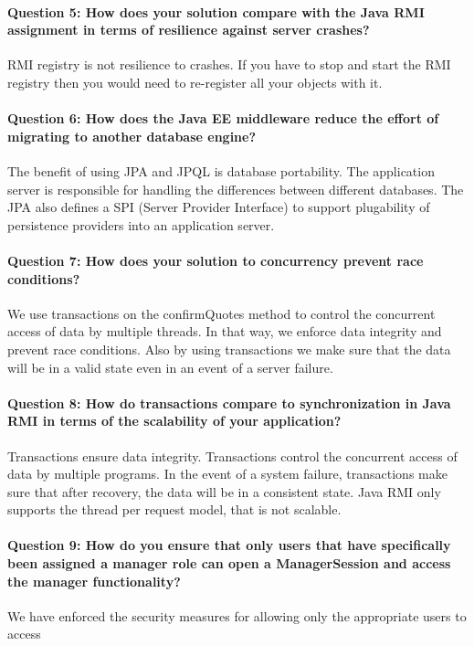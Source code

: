 \documentclass{ds-report}
\begin{document}
	\paragraph{Question 5: How does your solution compare with the Java RMI assignment in terms of resilience against server crashes?\\} 
	RMI registry is not resilience to crashes. If you have to stop and start the RMI registry then you would need to re-register all your objects with it.
	
	\paragraph{Question 6: How does the Java EE middleware reduce the effort of migrating to another database engine?\\} 
		The benefit of using JPA and JPQL is database portability. The application server is responsible for handling the differences between different databases. The JPA also defines a SPI (Server Provider Interface) to support plugability of persistence providers into an application server.
		
	\paragraph{Question 7: How does your solution to concurrency prevent race conditions?\\} 
	We use transactions on the confirmQuotes method to control the concurrent access of data by multiple 
	threads. In that way, we enforce data integrity and prevent race conditions. Also by using transactions 
	we make sure that the data will be in a valid state even in an event of a server failure.
	
	\paragraph{Question 8: How do transactions compare to synchronization in Java RMI in terms of the scalability of your application?\\} 
	Transactions ensure data integrity. Transactions control the concurrent access of data by multiple programs. In the event of a system failure, transactions make sure that after recovery, the data will be in a consistent state. Java RMI only supports the thread per request model, that is not scalable.
	
	\paragraph{Question 9: How do you ensure that only users that have specifically been assigned a manager role can open a ManagerSession and access the manager functionality?\\} 
	We have enforced the security measures for allowing only the appropriate users to access 
	
\end{document}
